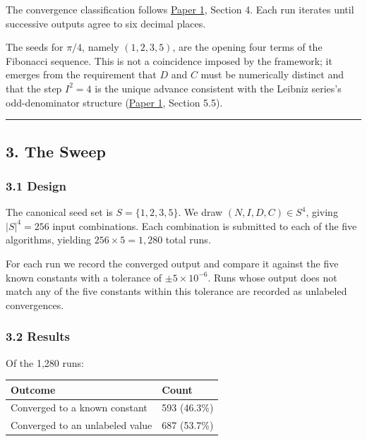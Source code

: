 \documentclass[
  11pt,
  letterpaper,
]{article}
\begin{document}
The convergence classification follows
\href{https://github.com/baardev/truevalue/blob/main/docnav/Research/papers/1_recursive-tholonic-five-constants/1_recursive-tholonic-five-constants.pdf}{Paper
1}, Section 4. Each run iterates until successive outputs agree to six
decimal places.

The seeds for \(\pi/4\), namely \((1, 2, 3, 5)\), are the opening four
terms of the Fibonacci sequence. This is not a coincidence imposed by
the framework; it emerges from the requirement that \(D\) and \(C\) must
be numerically distinct and that the step \(I^2 = 4\) is the unique
advance consistent with the Leibniz series's odd-denominator structure
(\href{https://github.com/baardev/truevalue/blob/main/docnav/Research/papers/1_recursive-tholonic-five-constants/1_recursive-tholonic-five-constants.pdf}{Paper
1}, Section 5.5).

\begin{center}\rule{0.5\linewidth}{0.5pt}\end{center}

\subsection{3. The Sweep}\label{the-sweep}

\subsubsection{3.1 Design}\label{design}

The canonical seed set is \(S = \{1, 2, 3, 5\}\). We draw
\((N, I, D, C) \in S^4\), giving \(|S|^4 = 256\) input combinations.
Each combination is submitted to each of the five algorithms, yielding
\(256 \times 5 = 1{,}280\) total runs.

For each run we record the converged output and compare it against the
five known constants with a tolerance of \(\pm 5 \times 10^{-6}\). Runs
whose output does not match any of the five constants within this
tolerance are recorded as unlabeled convergences.

\subsubsection{3.2 Results}\label{results}

Of the 1,280 runs:

\begin{longtable}[]{@{}ll@{}}
\toprule\noalign{}
Outcome & Count \\
\midrule\noalign{}
\endhead
\bottomrule\noalign{}
\endlastfoot
Converged to a known constant & 593 (46.3\%) \\
Converged to an unlabeled value & 687 (53.7\%) \\
\end{longtable}
\end{document}
